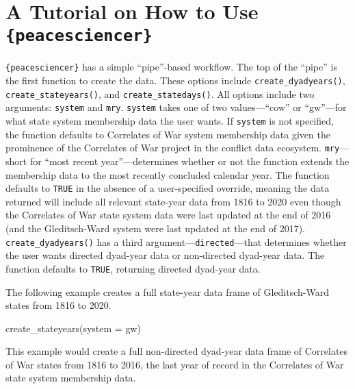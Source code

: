 \documentclass[
  11pt,
]{article}
\newenvironment{Shaded}{\begin{snugshade}}{\end{snugshade}}
\newcommand{\AttributeTok}[1]{\textcolor[rgb]{0.77,0.63,0.00}{#1}}
\newcommand{\FunctionTok}[1]{\textcolor[rgb]{0.00,0.00,0.00}{#1}}
\newcommand{\NormalTok}[1]{#1}
\newcommand{\StringTok}[1]{\textcolor[rgb]{0.31,0.60,0.02}{#1}}
\begin{document}
\hypertarget{a-tutorial-on-how-to-use-peacesciencer}{%
\section{\texorpdfstring{A Tutorial on How to Use \texttt{\{peacesciencer\}}}{A Tutorial on How to Use \{peacesciencer\}}}\label{a-tutorial-on-how-to-use-peacesciencer}}

\texttt{\{peacesciencer\}} has a simple ``pipe''-based workflow. The top of the ``pipe'' is the first function to create the data. These options include \texttt{create\_dyadyears()}, \texttt{create\_stateyears()}, and \texttt{create\_statedays()}. All options include two arguments: \texttt{system} and \texttt{mry}. \texttt{system} takes one of two values---``cow'' or ``gw''---for what state system membership data the user wants. If \texttt{system} is not specified, the function defaults to Correlates of War system membership data given the prominence of the Correlates of War project in the conflict data ecosystem. \texttt{mry}---short for ``most recent year''---determines whether or not the function extends the membership data to the most recently concluded calendar year. The function defaults to \texttt{TRUE} in the absence of a user-specified override, meaning the data returned will include all relevant state-year data from 1816 to 2020 even though the Correlates of War state system data were last updated at the end of 2016 (and the Gleditsch-Ward system were last updated at the end of 2017). \texttt{create\_dyadyears()} has a third argument---\texttt{directed}---that determines whether the user wants directed dyad-year data or non-directed dyad-year data. The function defaults to \texttt{TRUE}, returning directed dyad-year data.

The following example creates a full state-year data frame of Gleditsch-Ward states from 1816 to 2020.

\begin{Shaded}
\begin{Highlighting}[]
\FunctionTok{create\_stateyears}\NormalTok{(}\AttributeTok{system =} \StringTok{\textquotesingle{}gw\textquotesingle{}}\NormalTok{)}
\end{Highlighting}
\end{Shaded}

This example would create a full non-directed dyad-year data frame of Correlates of War states from 1816 to 2016, the last year of record in the Correlates of War state system membership data.
\end{document}
